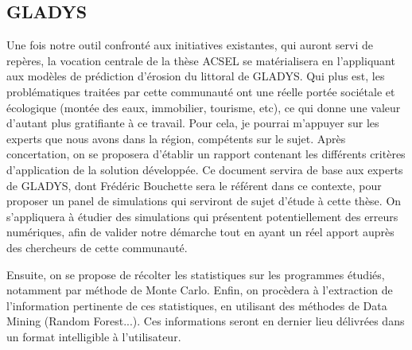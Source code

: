 \documentclass[a4paper,11pt]{article}
\begin{document}
\subsection{GLADYS}
Une fois notre outil confronté aux initiatives existantes, qui auront servi de repères, la vocation centrale de la thèse ACSEL se matérialisera en l'appliquant aux modèles de prédiction d'érosion du littoral de GLADYS. Qui plus est, les problématiques traitées par cette communauté ont une réelle portée sociétale et écologique (montée des eaux, immobilier, tourisme, etc), ce qui donne une valeur d'autant plus gratifiante à ce travail.
Pour cela, je pourrai m'appuyer sur les experts que nous avons dans la région, compétents sur le sujet.
Après concertation, on se proposera d'établir un rapport contenant les différents critères d'application de la solution développée. Ce document servira de base aux experts de GLADYS, dont Frédéric Bouchette sera le référent dans ce contexte, pour proposer un panel de simulations qui serviront de sujet d'étude à cette thèse.
On s'appliquera à étudier des simulations qui présentent potentiellement des erreurs numériques, afin de valider notre démarche tout en ayant un réel apport auprès des chercheurs de cette communauté.

Ensuite, on se propose de récolter les statistiques sur les programmes étudiés, notamment par méthode de Monte Carlo.
Enfin, on procèdera à l'extraction de l'information pertinente de ces statistiques, en utilisant des méthodes de Data Mining (Random Forest...).
Ces informations seront en dernier lieu délivrées dans un format intelligible à l'utilisateur.
\end{document}
